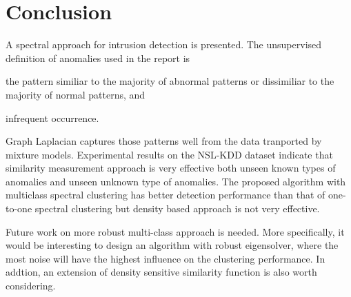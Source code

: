 \section{Conclusion}
A spectral approach for intrusion detection is presented. 
The unsupervised definition of anomalies used in the report is 
\begin{inparaenum}
\item the pattern similiar to the majority of abnormal patterns or dissimiliar to the majority of normal patterns, and
\item infrequent occurrence.
\end{inparaenum}
Graph Laplacian captures those patterns well from the data tranported by mixture models. 
Experimental results on the NSL-KDD dataset indicate that similarity measurement approach is very effective both unseen known types of anomalies and unseen unknown type of anomalies. 
The proposed algorithm with multiclass spectral clustering has better detection performance than that of one-to-one spectral clustering but density based approach is not very effective. 

Future work on more robust multi-class approach is needed. 
More specifically, it would be interesting to design an algorithm with robust eigensolver, where the most noise will have the highest influence on the clustering performance. 
In addtion, an extension of density sensitive similarity function is also worth considering. 
